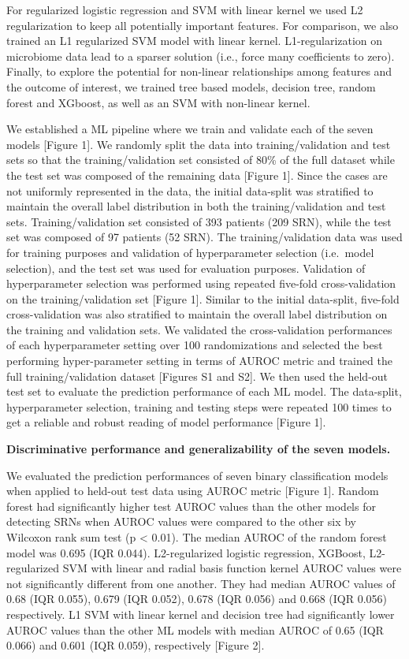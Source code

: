 \documentclass[11pt,]{article}
\begin{document}
For regularized logistic regression and SVM with linear kernel we used
L2 regularization to keep all potentially important features. For
comparison, we also trained an L1 regularized SVM model with linear
kernel. L1-regularization on microbiome data lead to a sparser solution
(i.e., force many coefficients to zero). Finally, to explore the
potential for non-linear relationships among features and the outcome of
interest, we trained tree based models, decision tree, random forest and
XGboost, as well as an SVM with non-linear kernel.

We established a ML pipeline where we train and validate each of the
seven models {[}Figure 1{]}. We randomly split the data into
training/validation and test sets so that the training/validation set
consisted of 80\% of the full dataset while the test set was composed of
the remaining data {[}Figure 1{]}. Since the cases are not uniformly
represented in the data, the initial data-split was stratified to
maintain the overall label distribution in both the training/validation
and test sets. Training/validation set consisted of 393 patients (209
SRN), while the test set was composed of 97 patients (52 SRN). The
training/validation data was used for training purposes and validation
of hyperparameter selection (i.e.~model selection), and the test set was
used for evaluation purposes. Validation of hyperparameter selection was
performed using repeated five-fold cross-validation on the
training/validation set {[}Figure 1{]}. Similar to the initial
data-split, five-fold cross-validation was also stratified to maintain
the overall label distribution on the training and validation sets. We
validated the cross-validation performances of each hyperparameter
setting over 100 randomizations and selected the best performing
hyper-parameter setting in terms of AUROC metric and trained the full
training/validation dataset {[}Figures S1 and S2{]}. We then used the
held-out test set to evaluate the prediction performance of each ML
model. The data-split, hyperparameter selection, training and testing
steps were repeated 100 times to get a reliable and robust reading of
model performance {[}Figure 1{]}.

\textbf{Discriminative performance and generalizability of the seven
models.}

We evaluated the prediction performances of seven binary classification
models when applied to held-out test data using AUROC metric {[}Figure
1{]}. Random forest had significantly higher test AUROC values than the
other models for detecting SRNs when AUROC values were compared to the
other six by Wilcoxon rank sum test (p \textless{} 0.01). The median
AUROC of the random forest model was 0.695 (IQR 0.044). L2-regularized
logistic regression, XGBoost, L2-regularized SVM with linear and radial
basis function kernel AUROC values were not significantly different from
one another. They had median AUROC values of 0.68 (IQR 0.055), 0.679
(IQR 0.052), 0.678 (IQR 0.056) and 0.668 (IQR 0.056) respectively. L1
SVM with linear kernel and decision tree had significantly lower AUROC
values than the other ML models with median AUROC of 0.65 (IQR 0.066)
and 0.601 (IQR 0.059), respectively {[}Figure 2{]}.
\end{document}
